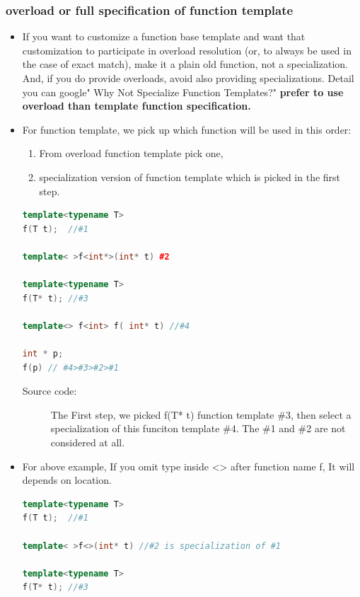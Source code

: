 \documentclass[a4paper,11pt,twoside]{book}
\begin{document}
\subsubsection{overload or full specification of function template}

\begin{itemize}
	\item  If you want to customize a function base template and want that customization to participate in overload resolution (or, to always be used in the case of exact match), make it a plain old function, not a specialization. And, if you do provide overloads, avoid also providing specializations. Detail you can google" Why Not Specialize Function Templates?" \textbf{prefer to use overload than template function specification.}

	\item For function template, we pick up which function will be used in this order: 
	\begin{enumerate}
		\item From overload function template pick one,
		\item specialization version of function template which is picked in the first step.
	\end{enumerate}

\begin{lstlisting}[frame=single, language=c++]
template<typename T>
f(T t);  //#1

template< >f<int*>(int* t) #2

template<typename T>
f(T* t); //#3

template<> f<int> f( int* t) //#4

int * p;
f(p) // #4>#3>#2>#1
\end{lstlisting}
\begin{description}
	\item[Source code:] The First step, we picked f(T* t) function template \#3, then select a specialization of this funciton template \#4. The \#1 and \#2 are not considered at all.
\end{description}

\item For above example, If you omit type inside <> after function name f, It will depends on location.
\begin{lstlisting}[frame=single, language=c++]
template<typename T>
f(T t);  //#1

template< >f<>(int* t) //#2 is specialization of #1

template<typename T>
f(T* t); //#3


\end{lstlisting}
\end{itemize}
\end{document}
